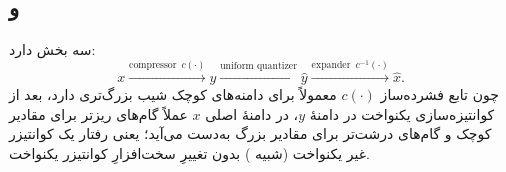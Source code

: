 \subsection*{و}
 سه بخش دارد:
\[
x \xrightarrow{\text{compressor }\,c(\cdot)} y \xrightarrow{\text{uniform quantizer}} \hat y \xrightarrow{\text{expander }\,c^{-1}(\cdot)} \hat x.
\]
چون تابع فشرده‌ساز $c(\cdot)$ معمولاً برای دامنه‌های کوچک شیب بزرگ‌تری دارد، بعد از کوانتیزه‌سازی یکنواخت در دامنهٔ $y$، در دامنهٔ اصلی $x$ عملاً گام‌های ریزتر برای مقادیر کوچک و گام‌های درشت‌تر برای مقادیر بزرگ به‌دست می‌آید؛ یعنی رفتار یک کوانتیزر غیر یکنواخت (شبیه ) بدون تغییرِ سخت‌افزارِ کوانتیزر یکنواخت.
